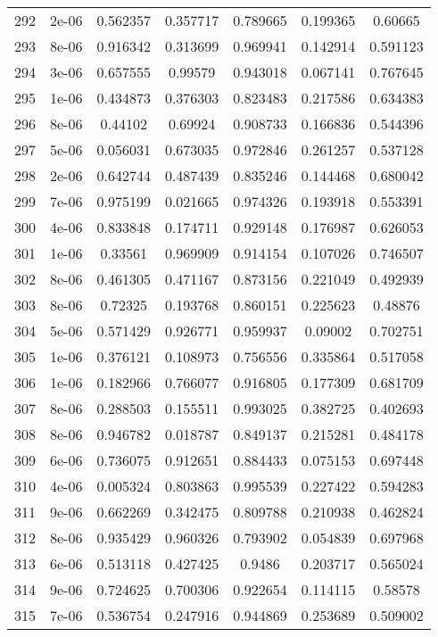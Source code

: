 \begin{table}
\begin{tabular*}{\linewidth}{c|c|c|c|c|c|c}
292 & 2e-06 & 0.562357 & 0.357717 & 0.789665 & 0.199365 & 0.60665\\
293 & 8e-06 & 0.916342 & 0.313699 & 0.969941 & 0.142914 & 0.591123\\
294 & 3e-06 & 0.657555 & 0.99579 & 0.943018 & 0.067141 & 0.767645\\
295 & 1e-06 & 0.434873 & 0.376303 & 0.823483 & 0.217586 & 0.634383\\
296 & 8e-06 & 0.44102 & 0.69924 & 0.908733 & 0.166836 & 0.544396\\
297 & 5e-06 & 0.056031 & 0.673035 & 0.972846 & 0.261257 & 0.537128\\
298 & 2e-06 & 0.642744 & 0.487439 & 0.835246 & 0.144468 & 0.680042\\
299 & 7e-06 & 0.975199 & 0.021665 & 0.974326 & 0.193918 & 0.553391\\
300 & 4e-06 & 0.833848 & 0.174711 & 0.929148 & 0.176987 & 0.626053\\
301 & 1e-06 & 0.33561 & 0.969909 & 0.914154 & 0.107026 & 0.746507\\
302 & 8e-06 & 0.461305 & 0.471167 & 0.873156 & 0.221049 & 0.492939\\
303 & 8e-06 & 0.72325 & 0.193768 & 0.860151 & 0.225623 & 0.48876\\
304 & 5e-06 & 0.571429 & 0.926771 & 0.959937 & 0.09002 & 0.702751\\
305 & 1e-06 & 0.376121 & 0.108973 & 0.756556 & 0.335864 & 0.517058\\
306 & 1e-06 & 0.182966 & 0.766077 & 0.916805 & 0.177309 & 0.681709\\
307 & 8e-06 & 0.288503 & 0.155511 & 0.993025 & 0.382725 & 0.402693\\
308 & 8e-06 & 0.946782 & 0.018787 & 0.849137 & 0.215281 & 0.484178\\
309 & 6e-06 & 0.736075 & 0.912651 & 0.884433 & 0.075153 & 0.697448\\
310 & 4e-06 & 0.005324 & 0.803863 & 0.995539 & 0.227422 & 0.594283\\
311 & 9e-06 & 0.662269 & 0.342475 & 0.809788 & 0.210938 & 0.462824\\
312 & 8e-06 & 0.935429 & 0.960326 & 0.793902 & 0.054839 & 0.697968\\
313 & 6e-06 & 0.513118 & 0.427425 & 0.9486 & 0.203717 & 0.565024\\
314 & 9e-06 & 0.724625 & 0.700306 & 0.922654 & 0.114115 & 0.58578\\
315 & 7e-06 & 0.536754 & 0.247916 & 0.944869 & 0.253689 & 0.509002\\
\end{tabular*}
\end{table}

